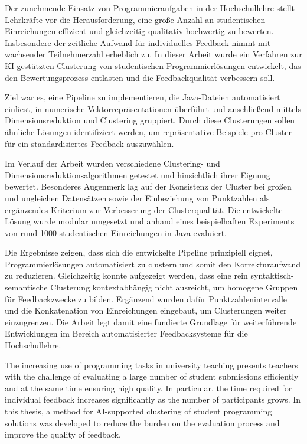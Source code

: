 \kurzfassung

Der zunehmende Einsatz von Programmieraufgaben in der Hochschullehre stellt Lehrkräfte vor die Herausforderung, eine große Anzahl an studentischen Einreichungen effizient und gleichzeitig qualitativ hochwertig zu bewerten. Insbesondere der zeitliche Aufwand für individuelles Feedback nimmt mit wachsender Teilnehmerzahl erheblich zu. In dieser Arbeit wurde ein Verfahren zur KI-gestützten Clusterung von studentischen Programmierlösungen entwickelt, das den Bewertungsprozess entlasten und die Feedbackqualität verbessern soll.

Ziel war es, eine Pipeline zu implementieren, die Java-Dateien automatisiert einliest, in numerische Vektorrepräsentationen überführt und anschließend mittels Dimensionsreduktion und Clustering gruppiert. Durch diese Clusterungen sollen ähnliche Lösungen identifiziert werden, um repräsentative Beispiele pro Cluster für ein standardisiertes Feedback auszuwählen.

Im Verlauf der Arbeit wurden verschiedene Clustering- und Dimensionsreduktionsalgorithmen getestet und hinsichtlich ihrer Eignung bewertet. Besonderes Augenmerk lag auf der Konsistenz der Cluster bei großen und ungleichen Datensätzen sowie der Einbeziehung von Punktzahlen als ergänzendes Kriterium zur Verbesserung der Clusterqualität. Die entwickelte Lösung wurde modular umgesetzt und anhand eines beispielhaften Experiments von rund 1000 studentischen Einreichungen in Java evaluiert.

Die Ergebnisse zeigen, dass sich die entwickelte Pipeline prinzipiell eignet, Programmierlösungen automatisiert zu clustern und somit den Korrekturaufwand zu reduzieren. Gleichzeitig konnte aufgezeigt werden, dass eine rein syntaktisch-semantische Clusterung kontextabhängig nicht ausreicht, um homogene Gruppen für Feedbackzwecke zu bilden. Ergänzend wurden dafür Punktzahlenintervalle und die Konkatenation von Einreichungen eingebaut, um Clusterungen weiter einzugrenzen. Die Arbeit legt damit eine fundierte Grundlage für weiterführende Entwicklungen im Bereich automatisierter Feedbacksysteme für die Hochschullehre.

\kurzfassungEN

The increasing use of programming tasks in university teaching presents teachers with the challenge of evaluating a large number of student submissions efficiently and at the same time ensuring high quality. In particular, the time required for individual feedback increases significantly as the number of participants grows. In this thesis, a method for AI-supported clustering of student programming solutions was developed to reduce the burden on the evaluation process and improve the quality of feedback.

